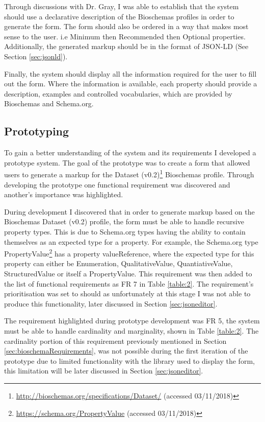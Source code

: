 Through discussions with Dr. Gray, I was able to establish that the system should use a declarative description of the Bioschemas profiles in order to generate the form. The form should also be ordered in a way that makes most sense to the user. i.e Minimum then Recommended then Optional properties. Additionally, the generated markup should be in the format of JSON-LD (See Section \ref{sec:jsonld}).

Finally, the system should display all the information required for the user to fill out the form. Where the information is available, each property should provide a description, examples and controlled vocabularies, which are provided by Bioschemas and Schema.org.

\subsection{Prototyping}\label{ch:prototyping}
To gain a better understanding of the system and its requirements I developed a prototype system. The goal of the prototype was to create a form that allowed users to generate a markup for the Dataset (v0.2)\footnote{\url{http://bioschemas.org/specifications/Dataset/} (accessed 03/11/2018)} Bioschemas profile. Through developing the prototype one functional requirement was discovered and another's importance was highlighted.

During development I discovered that in order to generate markup based on the Bioschemas Dataset (v0.2) profile, the form must be able to handle recursive property types. This is due to Schema.org types having the ability to contain themselves as an expected type for a property. For example, the Schema.org type PropertyValue\footnote{\url{https://schema.org/PropertyValue} (accessed 03/11/2018)} has a property valueReference, where the expected type for this property can either be Enumeration, QualitativeValue, QuantiativeValue, StructuredValue or itself a PropertyValue. This requirement was then added to the list of functional requirements as FR 7 in Table \ref{table:2}. The requirement's prioritisation was set to should as unfortunately at this stage I was not able to produce this functionality, later discussed in Section \ref{sec:jsoneditor}.

\newpage
The requirement highlighted during prototype development was FR 5, the system must be able to handle cardinality and marginality, shown in Table \ref{table:2}. The cardinality portion of this requirement previously mentioned in Section \ref{sec:bioschemaRequirements}, was not possible during the first iteration of the prototype due to limited functionality with the library used to display the form, this limitation will be later discussed in Section \ref{sec:jsoneditor}.


